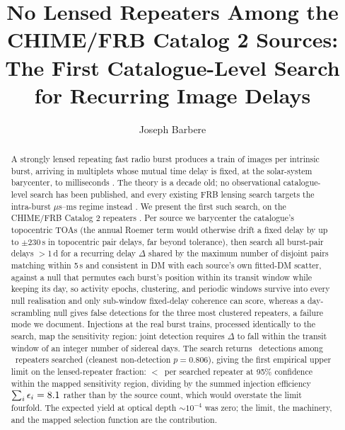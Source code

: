 \documentclass[twocolumn]{aastex631}
\begin{document}
\title{No Lensed Repeaters Among the CHIME/FRB Catalog 2 Sources:
The First Catalogue-Level Search for Recurring Image Delays}
\author[0009-0008-3289-4447]{Joseph Barbere}

\begin{abstract}
A strongly lensed repeating fast radio burst produces a train of images per intrinsic burst,
arriving in multiplets whose mutual time delay is fixed, at the solar-system barycenter, to
milliseconds \citep{dailu2017,li2018}. The theory is a decade old; no observational catalogue-level search
has been published, and every existing FRB lensing search targets the intra-burst
$\mu$s--ms regime instead \citep{leung2022,kader2022,cat1lens,microlens2026}. We present the
first such search, on the CHIME/FRB Catalog 2 repeaters \citep[83 sources, of which 33 have
the $\ge$5 bursts and $>$2-day spans the statistic needs;][]{cat2}. Per source we barycenter
the catalogue's topocentric TOAs (the annual Roemer term would otherwise drift a fixed delay
by up to $\pm$230\,s in topocentric pair delays, far beyond tolerance), then search
all burst-pair delays $>$1\,d for a recurring
delay $\Delta$ shared by the maximum number of disjoint pairs matching within 5\,s and
consistent in DM with each source's own fitted-DM scatter, against a null that permutes each
burst's position within its transit window while keeping its day, so activity epochs,
clustering, and periodic windows survive into every null realisation and only sub-window
fixed-delay coherence can score, whereas a day-scrambling null gives
false detections for the three most clustered repeaters, a failure mode we document.
Injections at the real burst trains, processed identically to the search, map the
sensitivity region: joint detection
requires $\Delta$ to fall within the transit window of an integer number of sidereal days.
The search returns \flRealNDet\ detections among \flRealNSearched\ repeaters searched
(cleanest non-detection $p=0.806$), giving the first empirical upper limit on the
lensed-repeater fraction: $<$\flRealLimit\ per searched repeater at 95\% confidence within
the mapped sensitivity region, dividing by the summed injection efficiency
$\sum_i \epsilon_i = 8.1$ rather than by the source count, which would overstate the
limit fourfold. The expected yield at optical depth $\sim$$10^{-4}$ was zero; the limit, the
machinery, and the mapped selection function are the contribution.
\end{abstract}

\end{document}
